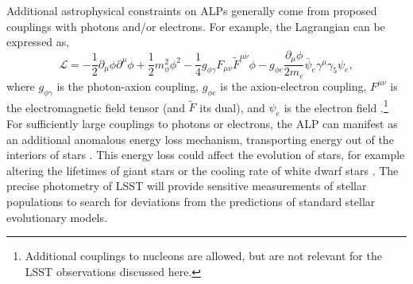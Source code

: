 Additional astrophysical constraints on ALPs generally come from proposed couplings with photons and/or electrons. 
For example, the Lagrangian can be expressed as,
\begin{equation}
    \mathcal{L} = -\frac{1}{2} \partial_\mu\phi\partial^\mu\phi + \frac{1}{2}m_\phi^2 \phi^2 - \frac{1}{4}g_{\phi\gamma}F_{\mu\nu}\tilde{F}^{\mu\nu}\phi - g_{\phi e}\frac{\partial_\mu\phi}{2m_e}\bar{\psi}_e \gamma^\mu\gamma_5\psi_e,
\end{equation}
where $g_{\phi\gamma}$ is the photon-axion coupling, $g_{\phi e}$ is the axion-electron coupling, $F^{\mu\nu}$ is the electromagnetic field tensor (and $\tilde{F}$ its dual), and $\psi_e$ is the electron field \citep[\eg][]{1302.6283,Redondo:2013wwa}.\footnote{Additional couplings to nucleons are allowed, but are not relevant for the LSST observations discussed here.}
For sufficiently large couplings to photons or electrons, the ALP can manifest as an additional anomalous energy loss mechanism, transporting energy out of the interiors of stars \citep[\eg,][]{Raffelt:1990}.
This energy loss could affect the evolution of stars, for example altering the lifetimes of giant stars \citep{Ayala:2014,Viaux:2013hca,Viaux:2013lha} or the cooling rate of white dwarf stars \citep{Isern:2008}.
The precise photometry of LSST will provide sensitive measurements of stellar populations to search for deviations from the predictions of standard stellar evolutionary models.

\begin{comment}
\TT{We should also mention the dark photon}
\ADW{Would we want to include some discussion of soliton cores from fuzzy DM?}

LSST will be able to probe axion dark matter in the following ways:
\begin{itemize}
    \item Caustics around Nearby Galaxies \CPW{11.25 Dealt with, now?}
    \item Anomalous Cooling in Stellar Populations 
    \begin{itemize}
        \item White dwarf luminosity function
        \item Globular cluster
        \item Cepheids / blue loop?
    \end{itemize}
    \item Supernova Observations
    
\end{itemize}
\end{comment}



